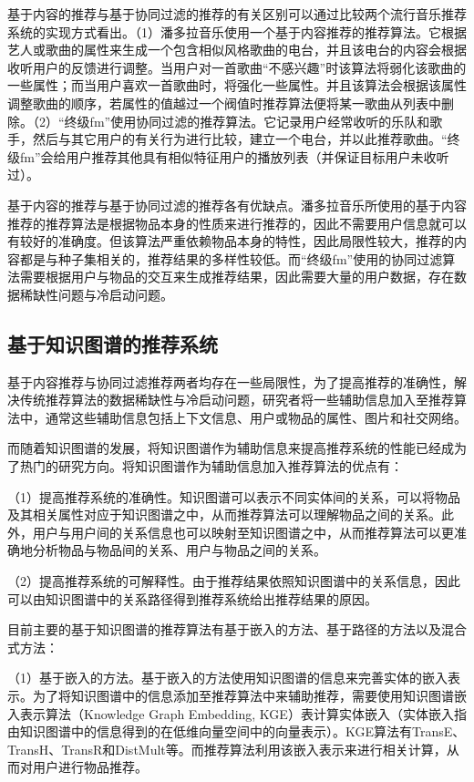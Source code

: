 \documentclass{bjfuthesis}
\begin{document}
基于内容的推荐与基于协同过滤的推荐的有关区别可以通过比较两个流行音乐推荐系统的实现方式看出。（1）潘多拉音乐使用一个基于内容推荐的推荐算法。它根据艺人或歌曲的属性来生成一个包含相似风格歌曲的电台，并且该电台的内容会根据收听用户的反馈进行调整。当用户对一首歌曲“不感兴趣”时该算法将弱化该歌曲的一些属性；而当用户喜欢一首歌曲时，将强化一些属性。并且该算法会根据该属性调整歌曲的顺序，若属性的值越过一个阀值时推荐算法便将某一歌曲从列表中删除。（2）“终级fm”使用协同过滤的推荐算法。它记录用户经常收听的乐队和歌手，然后与其它用户的有关行为进行比较，建立一个电台，并以此推荐歌曲。“终级fm”会给用户推荐其他具有相似特征用户的播放列表（并保证目标用户未收听过）。

基于内容的推荐与基于协同过滤的推荐各有优缺点。潘多拉音乐所使用的基于内容推荐的推荐算法是根据物品本身的性质来进行推荐的，因此不需要用户信息就可以有较好的准确度。但该算法严重依赖物品本身的特性，因此局限性较大，推荐的内容都是与种子集相关的，推荐结果的多样性较低。而“终级fm”使用的协同过滤算法需要根据用户与物品的交互来生成推荐结果，因此需要大量的用户数据，存在数据稀缺性问题与冷启动问题。
\subsection{基于知识图谱的推荐系统}
基于内容推荐与协同过滤推荐两者均存在一些局限性，为了提高推荐的准确性，解决传统推荐算法的数据稀缺性与冷启动问题，研究者将一些辅助信息加入至推荐算法中，通常这些辅助信息包括上下文信息、用户或物品的属性、图片和社交网络\cite{常亮2019知识图谱的推荐系统综述, 秦川2020基于知识图谱的推荐系统研究综述}。

而随着知识图谱的发展，将知识图谱作为辅助信息来提高推荐系统的性能已经成为了热门的研究方向。将知识图谱作为辅助信息加入推荐算法的优点有：

（1）提高推荐系统的准确性。知识图谱可以表示不同实体间的关系，可以将物品及其相关属性对应于知识图谱之中，从而推荐算法可以理解物品之间的关系。此外，用户与用户间的关系信息也可以映射至知识图谱之中，从而推荐算法可以更准确地分析物品与物品间的关系、用户与物品之间的关系。
    
（2）提高推荐系统的可解释性。由于推荐结果依照知识图谱中的关系信息，因此可以由知识图谱中的关系路径得到推荐系统给出推荐结果的原因。

目前主要的基于知识图谱的推荐算法有基于嵌入的方法、基于路径的方法以及混合式方法：

（1）基于嵌入的方法。基于嵌入的方法使用知识图谱的信息来完善实体的嵌入表示。为了将知识图谱中的信息添加至推荐算法中来辅助推荐，需要使用知识图谱嵌入表示算法（Knowledge Graph Embedding, KGE）表计算实体嵌入（实体嵌入指由知识图谱中的信息得到的在低维向量空间中的向量表示）。KGE算法有TransE\cite{bordes2013translating}、TransH\cite{wang2014knowledge}、TransR\cite{lin2017learning}和DistMult\cite{yang2014embedding}等。而推荐算法利用该嵌入表示来进行相关计算，从而对用户进行物品推荐。
\end{document}
